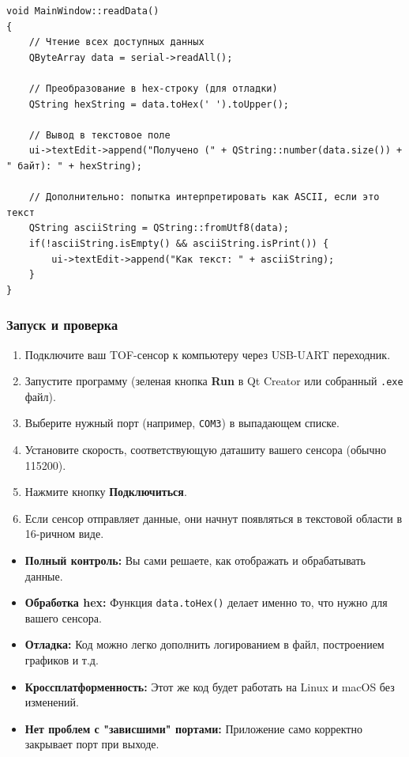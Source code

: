 \documentclass[12pt,a4paper]{article}
\begin{document}
\begin{lstlisting}[style=myCStyle, caption=Пример кода для проверки приема данных]
void MainWindow::readData()
{
    // Чтение всех доступных данных
    QByteArray data = serial->readAll();
    
    // Преобразование в hex-строку (для отладки)
    QString hexString = data.toHex(' ').toUpper();
    
    // Вывод в текстовое поле
    ui->textEdit->append("Получено (" + QString::number(data.size()) + " байт): " + hexString);
    
    // Дополнительно: попытка интерпретировать как ASCII, если это текст
    QString asciiString = QString::fromUtf8(data);
    if(!asciiString.isEmpty() && asciiString.isPrint()) {
        ui->textEdit->append("Как текст: " + asciiString);
    }
}
\end{lstlisting}

\begin{center}
\end{center}

\subsubsection*{Запуск и проверка}

\begin{enumerate}
    \item Подключите ваш TOF-сенсор к компьютеру через USB-UART переходник.
    \item Запустите программу (зеленая кнопка \textbf{Run} в Qt Creator или собранный \texttt{.exe} файл).
    \item Выберите нужный порт (например, \texttt{COM3}) в выпадающем списке.
    \item Установите скорость, соответствующую даташиту вашего сенсора (обычно 115200).
    \item Нажмите кнопку \textbf{Подключиться}.
    \item Если сенсор отправляет данные, они начнут появляться в текстовой области в 16-ричном виде.
\end{enumerate}

\begin{tcolorbox}[colback=green!5!white, colframe=green!75!black, title=Преимущества подхода на Qt]
\begin{itemize}
    \item \textbf{Полный контроль:} Вы сами решаете, как отображать и обрабатывать данные.
    \item \textbf{Обработка hex:} Функция \texttt{data.toHex()} делает именно то, что нужно для вашего сенсора.
    \item \textbf{Отладка:} Код можно легко дополнить логированием в файл, построением графиков и т.д.
    \item \textbf{Кроссплатформенность:} Этот же код будет работать на Linux и macOS без изменений.
    \item \textbf{Нет проблем с "зависшими" портами:} Приложение само корректно закрывает порт при выходе.
\end{itemize}
\end{tcolorbox}
\end{document}
